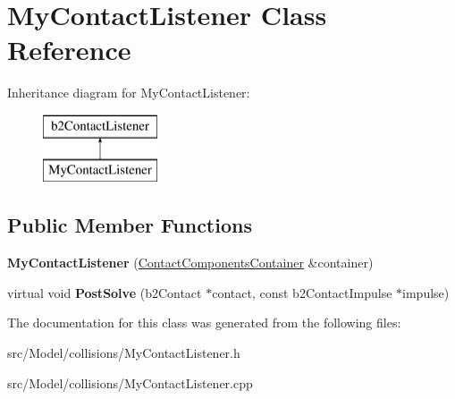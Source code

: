 \hypertarget{classMyContactListener}{}\section{My\+Contact\+Listener Class Reference}
\label{classMyContactListener}
Inheritance diagram for My\+Contact\+Listener\+:\begin{figure}[H]
\begin{center}
\leavevmode
\includegraphics[height=2.000000cm]{classMyContactListener}
\end{center}
\end{figure}
\subsection*{Public Member Functions}
\begin{DoxyCompactItemize}
\item 
{\bfseries My\+Contact\+Listener} (\hyperlink{classContactComponentsContainer}{Contact\+Components\+Container} \&container)\hypertarget{classMyContactListener_aa6f88684620d9e4ecdc1833a1107b1b2}{}\label{classMyContactListener_aa6f88684620d9e4ecdc1833a1107b1b2}

\item 
virtual void {\bfseries Post\+Solve} (b2\+Contact $\ast$contact, const b2\+Contact\+Impulse $\ast$impulse)\hypertarget{classMyContactListener_a691495aee67681d73d94c91e7c7a4df6}{}\label{classMyContactListener_a691495aee67681d73d94c91e7c7a4df6}

\end{DoxyCompactItemize}


The documentation for this class was generated from the following files\+:\begin{DoxyCompactItemize}
\item 
src/\+Model/collisions/My\+Contact\+Listener.\+h\item 
src/\+Model/collisions/My\+Contact\+Listener.\+cpp\end{DoxyCompactItemize}
